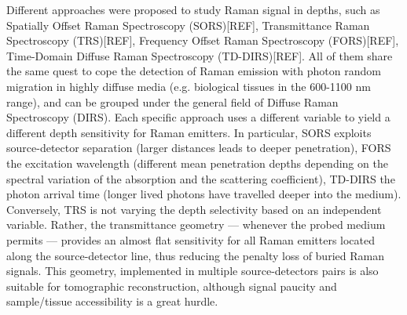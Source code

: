 \documentclass{osa-article}
\begin{document}
Different approaches were proposed to study Raman signal in depths, such as Spatially Offset Raman Spectroscopy (SORS)[REF], Transmittance Raman Spectroscopy (TRS)[REF], Frequency Offset Raman Spectroscopy (FORS)[REF], Time-Domain Diffuse Raman Spectroscopy (TD-DIRS)[REF]. All of them share the same quest to cope the detection of Raman emission with photon random migration in highly diffuse media (e.g. biological tissues in the 600-1100 nm range), and can be grouped under the general field of Diffuse Raman Spectroscopy (DIRS). Each specific approach uses a different variable to yield a different depth sensitivity for Raman emitters. In particular, SORS exploits source-detector separation (larger distances leads to deeper penetration), FORS the excitation wavelength (different mean penetration depths depending on the spectral variation of the absorption and the scattering coefficient), TD-DIRS the photon arrival time (longer lived photons have travelled deeper into the medium). Conversely, TRS is not varying the depth selectivity based on an independent variable. Rather, the transmittance geometry --- whenever the probed medium permits --- provides an almost flat sensitivity for all Raman emitters located along the source-detector line, thus reducing the penalty loss of buried Raman signals. This geometry, implemented in multiple source-detectors pairs is also suitable for tomographic reconstruction, although signal paucity and sample/tissue accessibility is a great hurdle.
\end{document}
